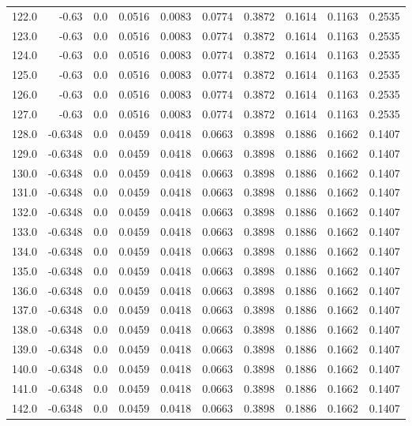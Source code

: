 \begin{longtable}{lrrrrrrrrr}
122.0 & -0.63 & 0.0 & 0.0516 & 0.0083 & 0.0774 & 0.3872 & 0.1614 & 0.1163 & 0.2535 \\
123.0 & -0.63 & 0.0 & 0.0516 & 0.0083 & 0.0774 & 0.3872 & 0.1614 & 0.1163 & 0.2535 \\
124.0 & -0.63 & 0.0 & 0.0516 & 0.0083 & 0.0774 & 0.3872 & 0.1614 & 0.1163 & 0.2535 \\
125.0 & -0.63 & 0.0 & 0.0516 & 0.0083 & 0.0774 & 0.3872 & 0.1614 & 0.1163 & 0.2535 \\
126.0 & -0.63 & 0.0 & 0.0516 & 0.0083 & 0.0774 & 0.3872 & 0.1614 & 0.1163 & 0.2535 \\
127.0 & -0.63 & 0.0 & 0.0516 & 0.0083 & 0.0774 & 0.3872 & 0.1614 & 0.1163 & 0.2535 \\
128.0 & -0.6348 & 0.0 & 0.0459 & 0.0418 & 0.0663 & 0.3898 & 0.1886 & 0.1662 & 0.1407 \\
129.0 & -0.6348 & 0.0 & 0.0459 & 0.0418 & 0.0663 & 0.3898 & 0.1886 & 0.1662 & 0.1407 \\
130.0 & -0.6348 & 0.0 & 0.0459 & 0.0418 & 0.0663 & 0.3898 & 0.1886 & 0.1662 & 0.1407 \\
131.0 & -0.6348 & 0.0 & 0.0459 & 0.0418 & 0.0663 & 0.3898 & 0.1886 & 0.1662 & 0.1407 \\
132.0 & -0.6348 & 0.0 & 0.0459 & 0.0418 & 0.0663 & 0.3898 & 0.1886 & 0.1662 & 0.1407 \\
133.0 & -0.6348 & 0.0 & 0.0459 & 0.0418 & 0.0663 & 0.3898 & 0.1886 & 0.1662 & 0.1407 \\
134.0 & -0.6348 & 0.0 & 0.0459 & 0.0418 & 0.0663 & 0.3898 & 0.1886 & 0.1662 & 0.1407 \\
135.0 & -0.6348 & 0.0 & 0.0459 & 0.0418 & 0.0663 & 0.3898 & 0.1886 & 0.1662 & 0.1407 \\
136.0 & -0.6348 & 0.0 & 0.0459 & 0.0418 & 0.0663 & 0.3898 & 0.1886 & 0.1662 & 0.1407 \\
137.0 & -0.6348 & 0.0 & 0.0459 & 0.0418 & 0.0663 & 0.3898 & 0.1886 & 0.1662 & 0.1407 \\
138.0 & -0.6348 & 0.0 & 0.0459 & 0.0418 & 0.0663 & 0.3898 & 0.1886 & 0.1662 & 0.1407 \\
139.0 & -0.6348 & 0.0 & 0.0459 & 0.0418 & 0.0663 & 0.3898 & 0.1886 & 0.1662 & 0.1407 \\
140.0 & -0.6348 & 0.0 & 0.0459 & 0.0418 & 0.0663 & 0.3898 & 0.1886 & 0.1662 & 0.1407 \\
141.0 & -0.6348 & 0.0 & 0.0459 & 0.0418 & 0.0663 & 0.3898 & 0.1886 & 0.1662 & 0.1407 \\
142.0 & -0.6348 & 0.0 & 0.0459 & 0.0418 & 0.0663 & 0.3898 & 0.1886 & 0.1662 & 0.1407 \\

\end{longtable}
